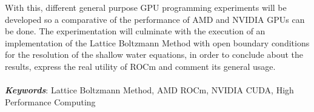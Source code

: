With this, different general purpose GPU programming experiments will be developed so a comparative of the performance of AMD and NVIDIA GPUs can be done.
The experimentation will culminate with the execution of an implementation of the Lattice Boltzmann Method with open boundary conditions for the resolution of the shallow water equations, in order to conclude about the results, express the real utility of ROCm and comment its general usage. \ \\
\vspace{0.3cm} \\
\noindent \textbf{\emph{Keywords}}: Lattice Boltzmann Method, AMD ROCm, NVIDIA CUDA, High Performance Computing \ \\
